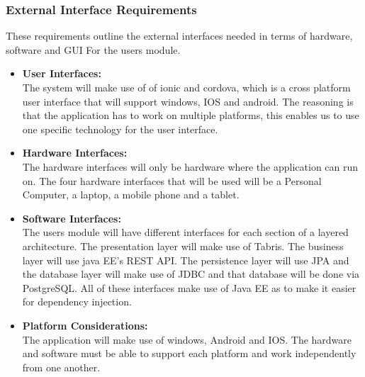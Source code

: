 \documentclass{article}
\begin{document}
 	\subsubsection{External Interface Requirements}
	 	These requirements outline the external interfaces needed in terms of hardware, software and GUI For the users module.
	 	\begin{itemize}	 		
	 	\item \textbf{User Interfaces:}
	 	\\The system will make use of of  ionic and cordova, which is a cross platform user interface that will support windows, IOS and android. The reasoning is that the application has to work on multiple platforms, this enables us to use one specific technology for the user interface.
	 	
	 	\item \textbf{Hardware Interfaces:}
	 	\\The hardware interfaces will only be hardware where the application can run on. The four hardware interfaces that will be used will be a Personal Computer, a laptop, a mobile phone and a tablet.
	 	
	 	\item \textbf{Software Interfaces:}
	 	\\The users module will have different interfaces for each section of a layered architecture. The presentation layer will make use of Tabris. The business layer will use java EE's REST API.  The persistence layer will use JPA and the database layer will make use of JDBC and that database will be done via PostgreSQL. All of these interfaces make use of Java EE as to make it easier for dependency injection.
	 	
	 	\item \textbf{Platform Considerations:}
	 	\\The application will make use of windows, Android and IOS. The hardware and software must be able to support each platform and work independently from one another.
	 \end{itemize}
	 
\end{document}
